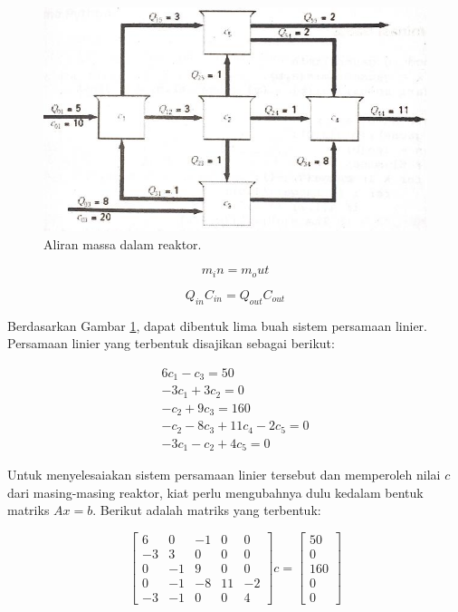 \documentclass[
]{book}
\theoremstyle{definition}
\theoremstyle{definition}
\theoremstyle{definition}
\theoremstyle{definition}
\theoremstyle{remark}
\begin{document}
\begin{figure}

{\centering \includegraphics[width=0.9\linewidth]{./images/reaktor} 

}

\caption{Aliran massa dalam reaktor.}\label{fig:reaktor}
\end{figure}

\begin{equation}
m_in=m_out
 \label{eq:steady}
\end{equation}

\begin{equation}
Q_{in}C_{in}= Q_{out}C_{out}
 \label{eq:steady2}
\end{equation}

Berdasarkan Gambar \ref{fig:reaktor}, dapat dibentuk lima buah sistem persamaan linier. Persamaan linier yang terbentuk disajikan sebagai berikut:

\[
\begin{matrix}
  6c_{1}-c_{3}=50 \\
  -3c_{1}+3c_{2}=0 \\
  -c_{2}+9c_{3}=160 \\
  -c_{2}-8c_{3}+11c_{4}-2c_{5}=0 \\
  -3c_{1}-c_{2}+4c_{5}=0
\end{matrix}
\]

Untuk menyelesaiakan sistem persamaan linier tersebut dan memperoleh nilai \(c\) dari masing-masing reaktor, kiat perlu mengubahnya dulu kedalam bentuk matriks \(Ax=b\). Berikut adalah matriks yang terbentuk:

\begin{equation*}
\begin{bmatrix}
      6 &  0 & -1 & 0  & 0    \\[0.3em]
     -3 &  3 & 0  & 0  & 0    \\[0.3em]
      0 & -1 & 9  & 0  & 0    \\[0.3em]
      0 & -1 & -8 & 11 & -2   \\[0.3em]
     -3 & -1 & 0  & 0  & 4
\end{bmatrix}
c = \begin{bmatrix}
     50     \\[0.3em]
     0      \\[0.3em]
     160    \\[0.3em]
     0      \\[0.3em]
     0
\end{bmatrix}
\end{equation*}
\end{document}
